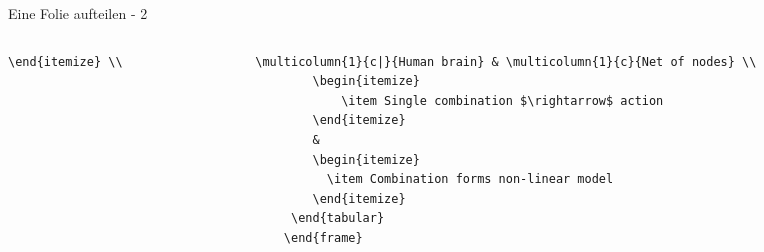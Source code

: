\documentclass{beamer}
\begin{document}
\begin{frame}[containsverbatim]{Eine Folie aufteilen - 2}
\begin{columns}
\begin{column}{0.5\textwidth}
\begin{lstlisting}[basicstyle=\fontsize{8}{9}\selectfont]
        \end{itemize} \\
        \end{lstlisting}
    \end{column}    
    \begin{column}{0.5\textwidth}
        \begin{lstlisting}[basicstyle=\fontsize{8}{9}\selectfont]
                \multicolumn{1}{c|}{Human brain} & \multicolumn{1}{c}{Net of nodes} \\
        \begin{itemize}
            \item Single combination $\rightarrow$ action
        \end{itemize}
        & 
        \begin{itemize}
          \item Combination forms non-linear model
        \end{itemize} 
     \end{tabular}
    \end{frame}
        \end{lstlisting}
    \end{column}    
\end{columns}
\end{frame}
\end{document}
